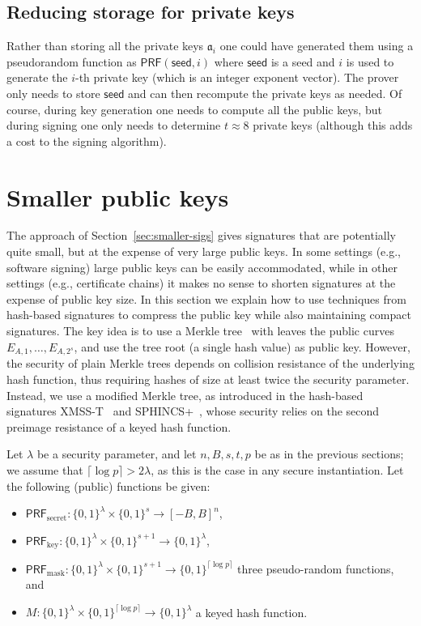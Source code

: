 \documentclass{llncs}
\newcommand{\seed}{\mathsf{seed}}
\renewcommand{\a}{\mathfrak{a}}
\newcommand{\PRF}{\mathsf{PRF}}
\newcommand{\PRFk}{\PRF_{\mathrm{key}}}
\newcommand{\PRFm}{\PRF_{\mathrm{mask}}}
\newcommand{\PRFs}{\PRF_{\mathrm{secret}}}
\begin{document}
\subsection{Reducing storage for private keys}\label{sec:private-key-compress}

Rather than storing all the private keys $\a_i$ one could have generated them using a pseudorandom function as $\PRF( \seed, i )$ where $\seed$ is a seed and $i$ is used to generate the $i$-th private key (which is an integer exponent vector).
The prover only needs to store $\seed$ and can then recompute the private keys as needed.
Of course, during key generation one needs to compute all the public keys, but during signing one only needs to determine $t \approx 8$ private keys (although this adds a cost to the signing algorithm).




\section{Smaller public keys} \label{sec:smaller-keys}

The approach of Section~\ref{sec:smaller-sigs} gives signatures that are potentially quite small, but at the expense of very large public keys. In some settings (e.g., software signing) large public keys can be easily accommodated, while in other settings (e.g., certificate chains) it makes no sense to shorten signatures at the expense of public key size.
In this section we explain how to use techniques from hash-based signatures to compress the public key while also maintaining compact signatures.
The key idea is to use a Merkle tree~\cite{10.1007/0-387-34805-0_21} with leaves the public curves $E_{A,1}, \dots, E_{A,2^s}$, and use the tree root (a single hash value) as public key.
However, the security of plain Merkle trees depends on collision resistance of the underlying hash function, thus requiring hashes of size at least twice the security parameter.
Instead, we use a modified Merkle tree, as introduced in the hash-based signatures XMSS-T~\cite{10.1007/978-3-662-49384-7_15} and SPHINCS+~\cite{sphincs+}, whose security relies on the second preimage resistance of a keyed hash function.

Let $\lambda$ be a security parameter, and let $n,B,s,t,p$ be as in the previous sections; we assume that $\lceil\log p\rceil > 2\lambda$, as this is the case in any secure instantiation.
Let the following (public) functions be given:

\begin{itemize}
\item $\PRFs: \{0,1\}^\lambda \times \{0,1\}^s \to [-B,B]^n$,
\item $\PRFk: \{0,1\}^\lambda \times \{0,1\}^{s+1} \to \{0,1\}^\lambda$,
\item $\PRFm: \{0,1\}^\lambda \times \{0,1\}^{s+1} \to \{0,1\}^{\lceil\log p\rceil}$ three pseudo-random functions, and
\item $M: \{0,1\}^\lambda \times \{0,1\}^{\lceil\log p\rceil} \to \{0,1\}^\lambda$ a keyed hash function.
\end{itemize}
\end{document}

